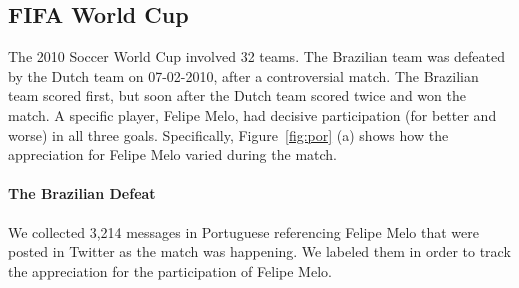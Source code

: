 \subsection{FIFA World Cup}

The 2010 Soccer World Cup involved 32 teams. The Brazilian team was defeated by the Dutch team on 07-02-2010, after a controversial match. The Brazilian team scored first, but soon after the Dutch team scored twice and won the match. A specific player, Felipe Melo, had decisive participation (for better and worse) in all three goals. Specifically, Figure~\ref{fig:por} (a) shows how the appreciation for Felipe Melo varied during the match.

\paragraph*{{The Brazilian Defeat}} We collected 3,214 messages in Portuguese referencing Felipe Melo that were posted in Twitter as the match was happening.
We labeled them in order to track the
appreciation for the participation of Felipe Melo.

